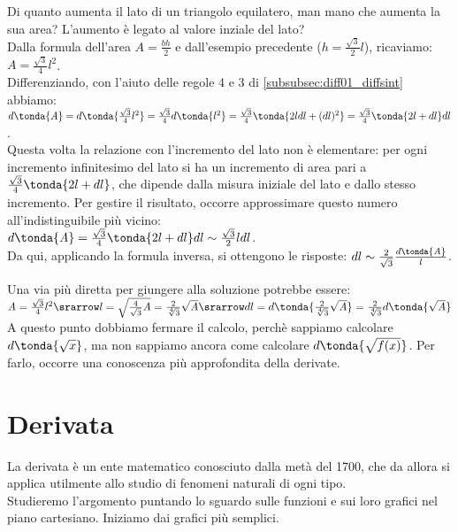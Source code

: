 \begin{esempio}
Di quanto aumenta il lato di un triangolo equilatero,
man mano che aumenta la sua area? L'aumento è legato al valore inziale del lato?\\
Dalla formula dell'area $\mathit{A}=\frac{bh}{2}$ e dall'esempio precedente
($h=\frac{\sqrt{3}}{2}l$), ricaviamo: $\mathit{A}=\frac{\sqrt{3}}{4}l^2$.\\
Differenziando, con l'aiuto delle regole 4 e 3 di 
\ref{subsubsec:diff01_diffsint} abbiamo:\\
$d\tonda{\mathit{A}}=d\tonda{\frac{\sqrt{3}}{4}l^2}=\frac{\sqrt{3}}{4}d\tonda{l^2}=
\frac{\sqrt{3}}{4}\tonda{2ldl+(dl)^2}=\frac{\sqrt{3}}{4}\tonda{2l+dl}dl$.\\
Questa volta la relazione con l'incremento del lato non è elementare: per ogni 
incremento infinitesimo del lato si ha un incremento di area pari a 
$\frac{\sqrt{3}}{4}\tonda{2l+dl}$, che dipende dalla misura iniziale del lato
e dallo stesso incremento. Per gestire il risultato, occorre approssimare
questo numero all'indistinguibile più vicino:\\
$d\tonda{\mathit{A}}=\frac{\sqrt{3}}{4}\tonda{2l+dl}dl\sim
\frac{\sqrt{3}}{2}ldl$.\\
Da qui, applicando la formula inversa, si ottengono le 
risposte:
$dl\sim\frac{2}{\sqrt{3}}\frac{d\tonda{\mathit{A}}}{l}$.
\begin{osservazione}
 Una via più diretta per giungere alla soluzione potrebbe essere: \\
 $\mathit{A}=\frac{\sqrt{3}}{4}l^2\srarrow l=\sqrt{\frac{4}{\sqrt{3}}\mathit{A}}=
 \frac{2}{\sqrt[4]{3}}\sqrt{\mathit{A}}\srarrow dl=
 d\tonda{\frac{2}{\sqrt[4]{3}}\sqrt{\mathit{A}}}=
 \frac{2}{\sqrt[4]{3}}d\tonda{\sqrt{\mathit{A}}}$\\
 A questo punto dobbiamo fermare il calcolo, perchè 
 sappiamo calcolare $d\tonda{\sqrt{x}}$, ma 
 non sappiamo ancora come calcolare $d\tonda{\sqrt{f(x)}}$. Per farlo, 
 occorre una conoscenza più approfondita della derivate.
\end{osservazione}

\end{esempio}
\section{Derivata}
\label{sec::diff01_derivata}
La derivata è un ente matematico conosciuto dalla metà del 1700, che 
da allora si applica utilmente allo studio di fenomeni naturali di ogni 
tipo.\\
Studieremo l'argomento puntando lo sguardo sulle funzioni e sui loro
grafici nel piano cartesiano. Iniziamo dai grafici più semplici.

